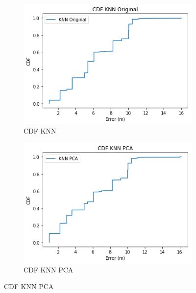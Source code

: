 \begin{figure}[ht!]
\centering
\begin{subfigure}{.5\textwidth}
  \centering
  \includegraphics[width=.8\linewidth]{figures/cdf-knn-dinamico.png}
  \caption{CDF KNN}
  \label{fig:sub1}
\end{subfigure}%
\begin{subfigure}{.5\textwidth}
  \centering
  \includegraphics[width=.8\linewidth]{figures/cdf-knnPCA-dinamico.png}
  \caption{CDF KNN PCA}
  \label{fig:sub2}
\end{subfigure}


\end{figure}
